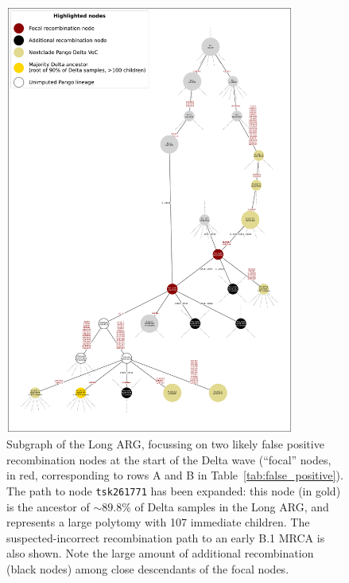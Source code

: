 \documentclass{article}
\begin{document}
\begin{figure} \centering
\includegraphics[width=0.85\textwidth]{figures/false_positive_top2_nxcld_large_graph.pdf}
\caption{\label{fig:false_positives}
Subgraph of the Long ARG, focussing on two likely false positive
recombination nodes at the start of the Delta wave
(``focal'' nodes, in red, corresponding to rows A and B in
Table~\ref{tab:false_positive}).
The path to node \texttt{tsk261771} has been expanded:
this node (in gold) is the ancestor of ${\sim}89.8\%$ of Delta samples in the Long ARG,
and represents a large polytomy with 107 immediate children.
The suspected-incorrect recombination path to an early B.1 MRCA is also shown.
Note the large amount of additional recombination (black nodes) among close
descendants of the focal nodes.
}
\end{figure}
\end{document}
